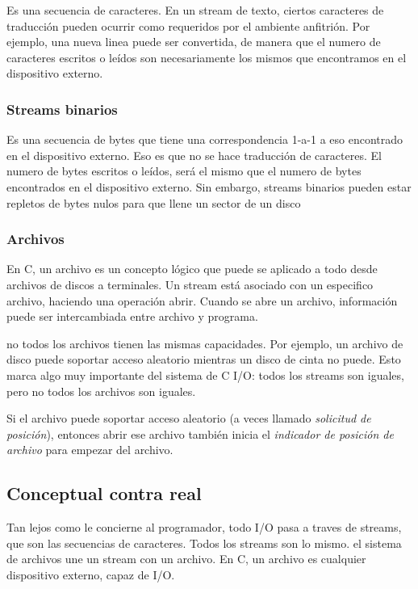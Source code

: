 \documentclass[]{article}
\begin{document}
	Es una secuencia de caracteres. En un stream de texto, ciertos caracteres de traducción pueden ocurrir como requeridos por el ambiente anfitrión. Por ejemplo, una nueva linea puede ser convertida, de manera que el numero de caracteres escritos o leídos son necesariamente los mismos que encontramos en el dispositivo externo.
	
	\subsubsection{Streams binarios}
	
	Es una secuencia de bytes que tiene una correspondencia 1-a-1 a eso encontrado en el dispositivo externo. Eso es que no se hace traducción de caracteres. El numero de bytes escritos o leídos, será el mismo que el numero de bytes encontrados en el dispositivo externo. Sin embargo, streams binarios pueden estar repletos de bytes nulos para que llene un sector de un disco
	
	\subsubsection{Archivos}
	
	En C, un archivo es un concepto lógico que puede se aplicado a todo desde archivos de discos a terminales. Un stream está asociado con un especifico archivo, haciendo una operación abrir. Cuando se abre un archivo, información puede ser intercambiada entre archivo y programa.
	
	no todos los archivos tienen las mismas capacidades. Por ejemplo, un archivo de disco puede soportar acceso aleatorio mientras un disco de cinta no puede. Esto marca algo muy importante del sistema de C I/O: todos los streams son iguales, pero no todos los archivos son iguales.
	
	Si el archivo puede soportar acceso aleatorio (a veces llamado \textit{solicitud de posición}), entonces abrir ese archivo también inicia el \textit{indicador de posición de archivo} para empezar del archivo.
	
	\subsection{Conceptual contra real}
	
	Tan lejos como le concierne al programador, todo I/O pasa a traves de streams, que son las secuencias de caracteres. Todos los streams son lo mismo. el sistema de archivos une un stream con un archivo. En C, un archivo es cualquier dispositivo externo, capaz de I/O.
	
\end{document}
